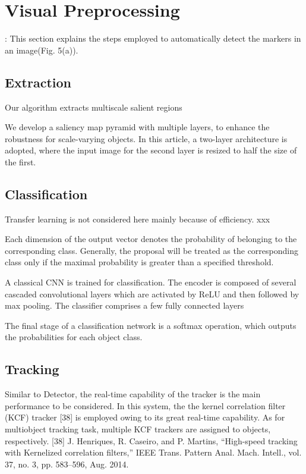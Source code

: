 \documentclass[a4paper]{report}
\begin{document}
\section{Visual Preprocessing}:
This section explains the steps employed to automatically
detect the markers in an image(Fig. 5(a)).
\subsection{Extraction}
Our algorithm extracts multiscale salient regions

We develop a saliency map pyramid with multiple layers, to enhance the robustness for
scale-varying objects. In this article, a two-layer architecture is adopted, where the input image for the second layer is resized to half the size of the first.

\subsection{Classification}

Transfer learning is not considered here mainly because of efficiency. xxx


Each dimension of the output vector denotes the probability of
belonging to the corresponding class. Generally, the proposal
will be treated as the corresponding class only if the maximal
probability is greater than a specified threshold.

A classical CNN is trained for classification. The encoder is composed of several cascaded convolutional layers which are activated by ReLU and then followed by max pooling. The classifier comprises a few fully connected layers

 The final stage of a classification network is a
softmax operation, which outputs the probabilities for each object class.


 




\subsection{Tracking}
Similar to Detector, the real-time capability of the tracker is
the main performance to be considered. In this system, the the
kernel correlation filter (KCF) tracker [38] is employed owing
to its great real-time capability. As for multiobject tracking task,
multiple KCF trackers are assigned to objects, respectively.
[38] J. Henriques, R. Caseiro, and P. Martins, “High-speed tracking with
Kernelized correlation filters,” IEEE Trans. Pattern Anal. Mach. Intell.,
vol. 37, no. 3, pp. 583–596, Aug. 2014.
\end{document}
